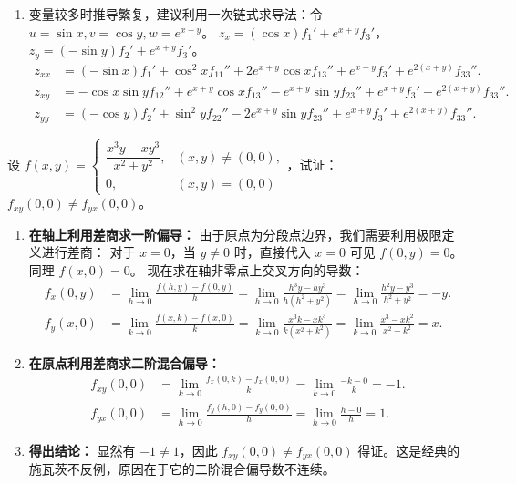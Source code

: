 \documentclass[lang=cn,11pt]{elegantbook}
\begin{document}
\begin{solution}
\begin{enumerate}
  \item[(6)] 变量较多时推导繁复，建议利用一次链式求导法：令 $u=\sin x, v=\cos y, w=e^{x+y}$。
  $z_x = (\cos x)f_1' + e^{x+y}f_3'$， $z_y = (-\sin y)f_2' + e^{x+y}f_3'$。
  \begin{align*}
  z_{xx} &= (-\sin x)f_1' + \cos^2 x f_{11}'' + 2e^{x+y}\cos x f_{13}'' + e^{x+y}f_3' + e^{2(x+y)}f_{33}''. \\
  z_{xy} &= -\cos x\sin y f_{12}'' + e^{x+y}\cos x f_{13}'' - e^{x+y}\sin y f_{23}'' + e^{x+y}f_3' + e^{2(x+y)}f_{33}''. \\
  z_{yy} &= (-\cos y)f_2' + \sin^2 y f_{22}'' - 2e^{x+y}\sin y f_{23}'' + e^{x+y}f_3' + e^{2(x+y)}f_{33}''.
  \end{align*}
\end{enumerate}
\end{solution}

\begin{exercise}[混合偏导数不相等]
设 $f(x,y) = \begin{cases} \dfrac{x^3y-xy^3}{x^2+y^2}, & (x,y)\neq(0,0), \\ 0, & (x,y)=(0,0) \end{cases}$，试证：$f_{xy}(0,0)\neq f_{yx}(0,0)$。
\end{exercise}

\begin{solution}
\begin{enumerate}
  \item \textbf{在轴上利用差商求一阶偏导：}
  由于原点为分段点边界，我们需要利用极限定义进行差商：
  对于 $x=0$，当 $y\neq 0$ 时，直接代入 $x=0$ 可见 $f(0,y) = 0$。同理 $f(x,0) = 0$。
  现在求在轴非零点上交叉方向的导数：
  \begin{align*}
  f_x(0,y) &= \lim_{h\to 0} \frac{f(h,y)-f(0,y)}{h} = \lim_{h\to 0} \frac{h^3y - hy^3}{h(h^2+y^2)} = \lim_{h\to 0} \frac{h^2y - y^3}{h^2+y^2} = -y. \\
  f_y(x,0) &= \lim_{k\to 0} \frac{f(x,k)-f(x,0)}{k} = \lim_{k\to 0} \frac{x^3k - xk^3}{k(x^2+k^2)} = \lim_{k\to 0} \frac{x^3 - xk^2}{x^2+k^2} = x.
  \end{align*}

  \item \textbf{在原点利用差商求二阶混合偏导：}
  \begin{align*}
  f_{xy}(0,0) &= \lim_{k\to 0} \frac{f_x(0,k)-f_x(0,0)}{k} = \lim_{k\to 0} \frac{-k - 0}{k} = -1. \\
  f_{yx}(0,0) &= \lim_{h\to 0} \frac{f_y(h,0)-f_y(0,0)}{h} = \lim_{h\to 0} \frac{h - 0}{h} = 1.
  \end{align*}

  \item \textbf{得出结论：}
  显然有 $-1 \neq 1$，因此 $f_{xy}(0,0) \neq f_{yx}(0,0)$ 得证。这是经典的施瓦茨不反例，原因在于它的二阶混合偏导数不连续。
\end{enumerate}
\end{solution}
\end{document}
